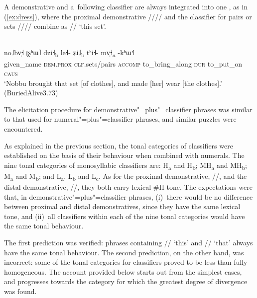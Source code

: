 A demonstrative and a~following classifier are always integrated into one , as in (\ref{ex:dress}), where the proximal demonstrative //// and the classifier for pairs or sets //// combine as // ‘this set'.

\begin{exe}
	\ex
	\label{ex:dress}
	\\
	\gll no˩bv̩˧		ʈʂʰɯ˥					dzi˧\textsubscript{b}			le˧-		ʑi˩\textsubscript{b}	tʰi˧-	mv̩˧\textsubscript{a}	-kʰɯ˧˥\\
	given\_name		\textsc{dem.prox}	\textsc{clf}.sets/pairs				\textsc{accomp}	to\_bring\_along		\textsc{dur}		to\_put\_on		\textsc{caus}\\
	\glt ‘Nobbu brought that set [of clothes], and made [her] wear [the clothes].’ (BuriedAlive3.73)
\end{exe}

The
elicitation procedure for demonstrative"=plus"=classifier phrases was similar to that used for numeral"=plus"=classifier phrases, and similar
puzzles were encountered.

As explained in the previous section, the tonal categories of classifiers were established on the
basis of their behaviour when combined with numerals. The nine tonal categories of monosyllabic classifiers are: H\textsubscript{a} and H\textsubscript{b}; MH\textsubscript{a} and
MH\textsubscript{b}; M\textsubscript{a} and M\textsubscript{b}; and L\textsubscript{a}, L\textsubscript{b} and L\textsubscript{c}. As for the proximal demonstrative, //, and the
distal demonstrative, //, they both carry lexical \#H tone. The expectations were that,
in demonstrative"=plus"=classifier phrases, (i)~there would be no difference between proximal and distal
demonstratives, since they have the same lexical tone, and (ii)~all classifiers within each of the
nine tonal categories would have the same tonal behaviour.

The first prediction was verified: phrases containing // ‘this’ and //
‘that’ always have the same tonal behaviour. The second prediction, on the other hand, was incorrect: some of the tonal categories for classifiers proved to be less than fully homogeneous. The
account provided below starts out from the simplest cases, and progresses towards the category for
which the greatest degree of divergence was found.

